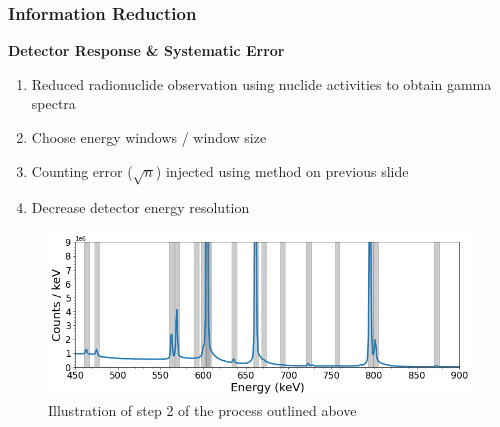 \begin{frame}
  \frametitle{Information Reduction}
  \textbf{\large Detector Response \& Systematic Error} \\
  \medskip
  \begin{enumerate}
    \item Reduced radionuclide observation using nuclide activities to obtain gamma spectra
    \item Choose energy windows / window size
    \item Counting error ($\sqrt{n}$) injected using method on previous slide
    \item Decrease detector energy resolution
  \end{enumerate}
  \begin{figure}[h!]
    \centering
    \includegraphics[height=0.4\textheight]{./figures/energy_window_example.png}
    \caption{Illustration of step 2 of the process outlined above}
  \end{figure}
\end{frame}
